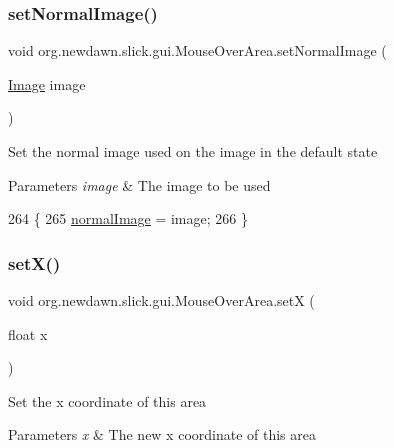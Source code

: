 \subsubsection{\texorpdfstring{set\+Normal\+Image()}{setNormalImage()}}
{\footnotesize\ttfamily void org.\+newdawn.\+slick.\+gui.\+Mouse\+Over\+Area.\+set\+Normal\+Image (\begin{DoxyParamCaption}\item[{\mbox{\hyperlink{classorg_1_1newdawn_1_1slick_1_1_image}{Image}}}]{image }\end{DoxyParamCaption})\hspace{0.3cm}{\ttfamily [inline]}}

Set the normal image used on the image in the default state


\begin{DoxyParams}{Parameters}
{\em image} & The image to be used \\
\hline
\end{DoxyParams}

\begin{DoxyCode}
264                                             \{
265         \mbox{\hyperlink{classorg_1_1newdawn_1_1slick_1_1gui_1_1_mouse_over_area_a9d302fcca78d86154144418ef065b04e}{normalImage}} = image;
266     \}
\end{DoxyCode}
\mbox{\label{classorg_1_1newdawn_1_1slick_1_1gui_1_1_mouse_over_area_a63a8c3bbd8f8ce9ae7c0dcf75cb61240}} 
\subsubsection{\texorpdfstring{set\+X()}{setX()}}
{\footnotesize\ttfamily void org.\+newdawn.\+slick.\+gui.\+Mouse\+Over\+Area.\+setX (\begin{DoxyParamCaption}\item[{float}]{x }\end{DoxyParamCaption})\hspace{0.3cm}{\ttfamily [inline]}}

Set the x coordinate of this area


\begin{DoxyParams}{Parameters}
{\em x} & The new x coordinate of this area \\
\hline
\end{DoxyParams}

